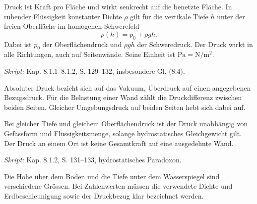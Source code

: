 
\begin{werkzeugkasten}
Druck ist Kraft pro Fläche und wirkt senkrecht auf die benetzte Fläche. In
ruhender Flüssigkeit konstanter Dichte \(\rho\) gilt für die vertikale Tiefe
\(h\) unter der freien Oberfläche im homogenen Schwerefeld
\begin{equation}
  p(h)=p_0+\rho gh.
\end{equation}
Dabei ist \(p_0\) der Oberflächendruck und \(\rho gh\) der Schweredruck. Der
Druck wirkt in alle Richtungen, auch auf Seitenwände. Seine Einheit ist
\(\si{\pascal}=\si{\newton\per\metre\squared}\).

\textit{Skript:} Kap. 8.1.1--8.1.2, S. 129--132, insbesondere Gl. (8.4).
\end{werkzeugkasten}

\begin{werkzeugkasten}
Absoluter Druck bezieht sich auf das Vakuum, Überdruck auf einen angegebenen
Bezugsdruck. Für die Belastung einer Wand zählt die Druckdifferenz zwischen
beiden Seiten. Gleicher Umgebungsdruck auf beiden Seiten hebt sich dabei auf.

Bei gleicher Tiefe und gleichem Oberflächendruck ist der Druck unabhängig von
Gefässform und Flüssigkeitsmenge, solange hydrostatisches Gleichgewicht gilt.
Der Druck an einem Ort ist keine Gesamtkraft auf eine ausgedehnte Wand.

\textit{Skript:} Kap. 8.1.2, S. 131--133, hydrostatisches Paradoxon.
\end{werkzeugkasten}

\begin{achtung}
Die Höhe über dem Boden und die Tiefe unter dem Wasserspiegel sind
verschiedene Grössen. Bei Zahlenwerten müssen die verwendete Dichte und
Erdbeschleunigung sowie der Druckbezug klar bezeichnet werden.
\end{achtung}
